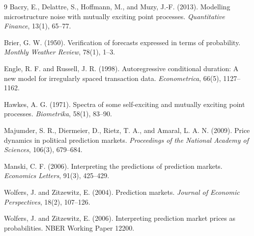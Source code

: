 \documentclass[11pt]{article}
\begin{document}
\begin{thebibliography}{9}
Bacry, E., Delattre, S., Hoffmann, M., and Muzy, J.-F. (2013).
Modelling microstructure noise with mutually exciting point processes.
\emph{Quantitative Finance}, 13(1), 65--77.

Brier, G. W. (1950).
Verification of forecasts expressed in terms of probability.
\emph{Monthly Weather Review}, 78(1), 1--3.

Engle, R. F. and Russell, J. R. (1998).
Autoregressive conditional duration: A new model for irregularly spaced transaction data.
\emph{Econometrica}, 66(5), 1127--1162.

Hawkes, A. G. (1971).
Spectra of some self-exciting and mutually exciting point processes.
\emph{Biometrika}, 58(1), 83--90.

Majumder, S. R., Diermeier, D., Rietz, T. A., and Amaral, L. A. N. (2009).
Price dynamics in political prediction markets.
\emph{Proceedings of the National Academy of Sciences}, 106(3), 679--684.

Manski, C. F. (2006).
Interpreting the predictions of prediction markets.
\emph{Economics Letters}, 91(3), 425--429.

Wolfers, J. and Zitzewitz, E. (2004).
Prediction markets.
\emph{Journal of Economic Perspectives}, 18(2), 107--126.

Wolfers, J. and Zitzewitz, E. (2006).
Interpreting prediction market prices as probabilities.
NBER Working Paper 12200.
\end{thebibliography}
\end{document}
